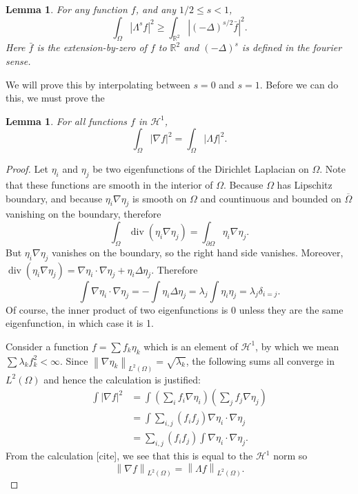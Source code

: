 \documentclass[11pt]{amsart}
\newtheorem{lemma}[theorem]{Lemma}
\theoremstyle{remark}
\theoremstyle{definition}
\newcommand{\R}{\mathbb{R}}
\newcommand{\norm}[1]{\left\lVert#1\right\rVert}
\newcommand{\paren}[1]{\left( #1 \right)}
\newcommand{\abs}[1]{\left\lvert #1 \right\rvert}
\newcommand{\del}{\partial}
\newcommand{\grad}{\nabla}
\renewcommand{\div}{\operatorname{div}}
\newcommand{\Laplace}{\Delta}
\newcommand{\eigen}[1]{\eta_{#1}} %
\newcommand{\HD}{\mathcal{H}}
\begin{document}
\begin{lemma} \label{thm:hadamard 3 lines}
For any function $f$, and any $1/2 \leq s < 1$,
\[ \int_\Omega \abs{\Lambda^s f}^2 \geq \int_{\R^2} \abs{\paren{-\Laplace}^{s/2} \bar{f}}^2. \]
Here $\bar{f}$ is the extension-by-zero of $f$ to $\R^2$ and $\paren{-\Laplace}^s$ is defined in the fourier sense.  
\end{lemma}

We will prove this by interpolating between $s = 0$ and $s=1$.  Before we can do this, we must prove the 

\begin{lemma} \label{thm:H1 and H1}
For all functions $f$ in $\HD^1$,
\[ \int_\Omega \abs{\grad f}^2 = \int_\Omega \abs{\Lambda f}^2. \]
\end{lemma}

\begin{proof}
Let $\eigen{i}$ and $\eigen{j}$ be two eigenfunctions of the Dirichlet Laplacian on $\Omega$.  Note that these functions are smooth in the interior of $\Omega$.  Because $\Omega$ has Lipschitz boundary, and because $\eigen{i} \grad \eigen{j}$ is smooth on $\Omega$ and countinuous and bounded on $\overline{\Omega}$ vanishing on the boundary, therefore 
\[ \int_\Omega \div(\eigen{i} \grad \eigen{j}) = \int_{\del \Omega} \eigen{i} \grad \eigen{j}. \]
But $\eigen{i} \grad \eigen{j}$ vanishes on the boundary, so the right hand side vanishes.  Moreover, $\div(\eigen{i} \grad \eigen{j}) = \grad \eigen{i} \cdot \grad \eigen{j} + \eigen{i} \Laplace \eigen{j}$.  Therefore
\[ \int \grad \eigen{i} \cdot \grad \eigen{j} = - \int \eigen{i} \Laplace \eigen{j} = \lambda_j \int \eigen{i} \eigen{j} = \lambda_j \delta_{i=j}. \]
Of course, the inner product of two eigenfunctions is 0 unless they are the same eigenfunction, in which case it is 1.  

Consider a function $f = \sum f_k \eigen{k}$ which is an element of $\HD^1$, by which we mean $\sum \lambda_k f_k^2 < \infty$.  Since $\norm{\grad \eigen{k}}_{L^2(\Omega)} = \sqrt{\lambda_k}$, the following sums all converge in $L^2(\Omega)$ and hence the calculation is justified:
\begin{align*}
\int \abs{\grad f}^2 &= \int \paren{\sum_i f_i \grad \eigen{i} } \paren{\sum_j f_j \grad \eigen{j}}
\\ &= \int \sum_{i,j} (f_i f_j) \grad \eigen{i} \cdot \grad \eigen{j}
\\ &= \sum_{i,j} (f_i f_j) \int \grad \eigen{i} \cdot \grad \eigen{j}.
\end{align*}
From the calculation [cite], we see that this is equal to the $\HD^1$ norm so
\[ \norm{\grad f}_{L^2(\Omega)} = \norm{\Lambda f}_{L^2(\Omega)}. \]
\end{proof}
\end{document}
